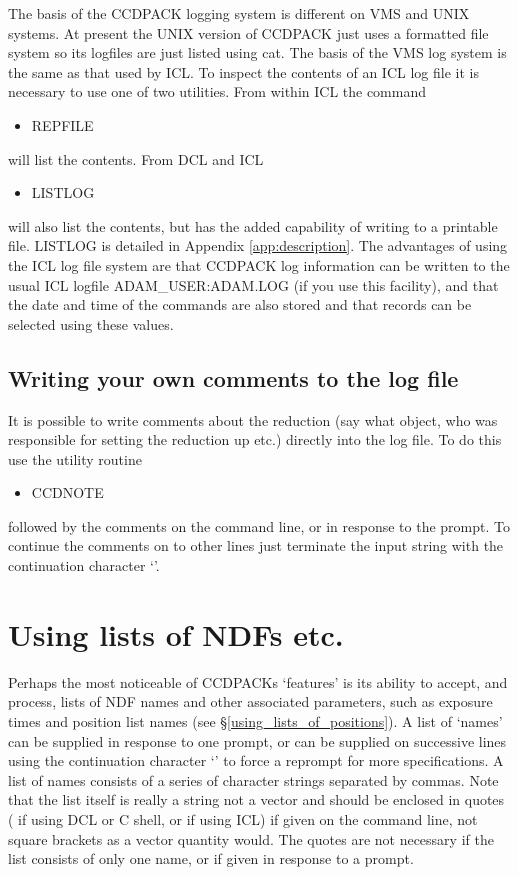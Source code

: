 The basis of the CCDPACK logging system is different on VMS and UNIX
systems. At present the UNIX version of CCDPACK just uses a formatted
file system so its logfiles are just listed using cat. The basis of the
VMS log system is the same as that used by ICL. To inspect the
contents of an ICL log file it is necessary to use one of two utilities.
From within ICL the command 
\begin{itemize}
\item REPFILE 
\end{itemize}
will list the contents. From DCL and ICL
\begin{itemize}
\item LISTLOG 
\end{itemize}
will also list the contents, but has the added capability of writing to
a printable file. LISTLOG is detailed in Appendix \ref{app:description}.
The advantages of using the ICL log file system are that CCDPACK log
information can be written to the usual ICL logfile ADAM\_USER:ADAM.LOG
(if you use this facility), and that the date and time of the commands
are also stored and that records can be selected using these values.

\subsection{Writing your own comments to the log file}

It is possible to write comments about the reduction (say what object,
who was responsible for setting the reduction up etc.) directly into the
log file. To do this use the utility routine

\begin{itemize}
\item CCDNOTE
\end{itemize}

followed by the comments on the command line, or in response to the
prompt. To continue the comments on to other lines just terminate the
input string with the continuation character `\myverb{-}'.

\section{Using lists of NDFs etc.}
\label{ndflists}

Perhaps the most noticeable of CCDPACKs `features' is its ability to
accept, and process, lists of NDF names and other associated parameters,
such as exposure times and position list names (see 
\S\ref{using_lists_of_positions}). A list of `names' can be supplied in
response to one prompt, or can be supplied on successive lines using the
continuation character `\myverb{-}' to force a reprompt for more
specifications. A list of names consists of a series of character
strings separated by commas. Note that the list itself is really a
string not a vector and should be enclosed in quotes ( if
using DCL or C shell,  or  if using ICL) if given
on the command line, not square brackets as a vector quantity would. The
quotes are not necessary if the list consists of only one name, or if
given in response to a prompt.

